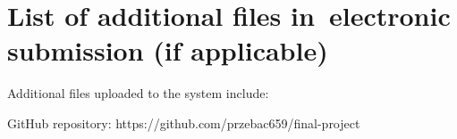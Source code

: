 \chapter{List of additional files in~electronic submission (if applicable)}


Additional files uploaded to the system include:
\begin{itemize}
GitHub repository: https://github.com/przebac659/final-project
\end{itemize}